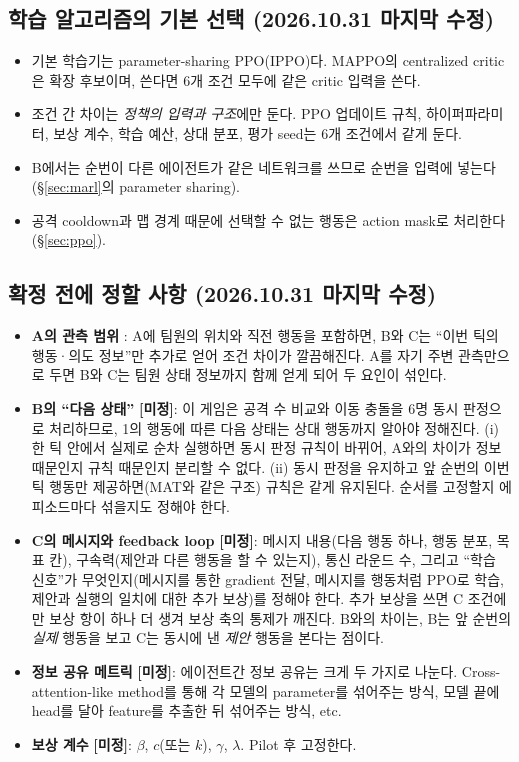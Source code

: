 \documentclass[11pt,a4paper]{article}
\newcommand{\TBD}{\textbf{[미정]}}
\begin{document}
\subsection{학습 알고리즘의 기본 선택 (2026.10.31 마지막 수정)}
\begin{itemize}
 \item 기본 학습기는 parameter-sharing PPO(IPPO)다. MAPPO의 centralized critic은 확장 후보이며, 쓴다면 6개 조건 모두에 같은 critic 입력을 쓴다.
 \item 조건 간 차이는 \emph{정책의 입력과 구조}에만 둔다. PPO 업데이트 규칙, 하이퍼파라미터, 보상 계수, 학습 예산, 상대 분포, 평가 seed는 6개 조건에서 같게 둔다.
 \item B에서는 순번이 다른 에이전트가 같은 네트워크를 쓰므로 순번을 입력에 넣는다(\S\ref{sec:marl}의 parameter sharing).
 \item 공격 cooldown과 맵 경계 때문에 선택할 수 없는 행동은 action mask로 처리한다(\S\ref{sec:ppo}).
\end{itemize}

\subsection{확정 전에 정할 사항 (2026.10.31 마지막 수정)}
\begin{itemize}
 \item \textbf{A의 관측 범위} : A에 팀원의 위치와 직전 행동을 포함하면, B와 C는 ``이번 틱의 행동·의도 정보''만 추가로 얻어 조건 차이가 깔끔해진다. A를 자기 주변 관측만으로 두면 B와 C는 팀원 상태 정보까지 함께 얻게 되어 두 요인이 섞인다.
 \item \textbf{B의 ``다음 상태''} \TBD: 이 게임은 공격 수 비교와 이동 충돌을 6명 동시 판정으로 처리하므로, 1의 행동에 따른 다음 상태는 상대 행동까지 알아야 정해진다. (i) 한 틱 안에서 실제로 순차 실행하면 동시 판정 규칙이 바뀌어, A와의 차이가 정보 때문인지 규칙 때문인지 분리할 수 없다. (ii) 동시 판정을 유지하고 앞 순번의 이번 틱 행동만 제공하면(MAT와 같은 구조) 규칙은 같게 유지된다. 순서를 고정할지 에피소드마다 섞을지도 정해야 한다.
 \item \textbf{C의 메시지와 feedback loop} \TBD: 메시지 내용(다음 행동 하나, 행동 분포, 목표 칸), 구속력(제안과 다른 행동을 할 수 있는지), 통신 라운드 수, 그리고 ``학습 신호''가 무엇인지(메시지를 통한 gradient 전달, 메시지를 행동처럼 PPO로 학습, 제안과 실행의 일치에 대한 추가 보상)를 정해야 한다. 추가 보상을 쓰면 C 조건에만 보상 항이 하나 더 생겨 보상 축의 통제가 깨진다. B와의 차이는, B는 앞 순번의 \emph{실제} 행동을 보고 C는 동시에 낸 \emph{제안} 행동을 본다는 점이다.
 \item \textbf{정보 공유 메트릭} \TBD: 에이전트간 정보 공유는 크게 두 가지로 나눈다. Cross-attention-like method를 통해 각 모델의 parameter를 섞어주는 방식, 모델 끝에 head를 달아 feature를 추출한 뒤 섞어주는 방식, etc.
 \item \textbf{보상 계수} \TBD: \(\beta\), \(c\)(또는 \(k\)), \(\gamma\), \(\lambda\). Pilot 후 고정한다.
\end{itemize}
\end{document}
